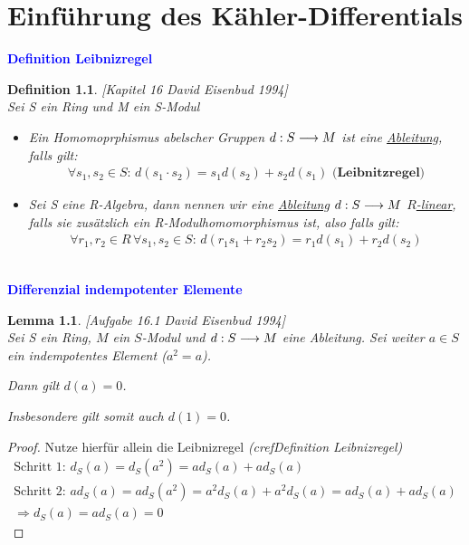 \documentclass[10pt,a4paper]{report}
\newcommand{\ModulsOfDifferenzials}{David Eisenbud 1994}
\newcounter{Aussage}[chapter]
\newtheorem{lemma}[Aussage]{Lemma}
\newtheorem{definition}[Aussage]{Definition}
\newcommand{\functionfront}[3]{\nolinebreak{#1:#2 \longrightarrow #3}}
\newcommand{\divf}[1]{d_{#1}}
\begin{document}
\chapter{Einführung des Kähler-Differentials}

\textcolor{blue}{\textbf{Definition Leibnizregel}}
\begin{definition}\label{Definition Leibnizregel} \textit{[Kapitel 16 \ModulsOfDifferenzials]}\\
Sei S ein Ring und M ein S-Modul
\begin{itemize}
\item[]Ein Homomoprphismus abelscher Gruppen $\functionfront{d}{S}{M}$ ist eine \underline{Ableitung}, falls gilt:
\begin{gather*}
\forall s_1,s_2 \in S :\, d(s_1 \cdot s_2) = s_1d(s_2) + s_2d(s_1) \textbf{ (Leibnitzregel)}
\end{gather*}
\item[]Sei S eine R-Algebra, dann nennen wir eine \underline{Ableitung} $\functionfront{d}{S}{M}$ \underline{$R$-linear}, falls sie zusätzlich ein R-Modulhomomorphismus ist, also falls gilt:
\begin{gather*}
\forall r_1,r_2 \in R \, \forall s_1,s_2 \in S : \, d(r_1 s_1 + r_2 s_2) = r_1 d(s_1) + r_2 d(s_2)
\end{gather*}
\end{itemize}
\end{definition}


\ \\
\textcolor{blue}{\textbf{Differenzial indempotenter Elemente}}
\begin{lemma}\label{Differenzial indempotenter Elemente} \textit{[Aufgabe 16.1 \ModulsOfDifferenzials]} \\
Sei S ein Ring, $M$ ein $S$-Modul und $\functionfront{d}{S}{M}$ eine Ableitung. Sei weiter $a \in S$ ein indempotentes Element ($a^2 = a$).
\begin{center}
Dann gilt $d(a) = 0$. 
\end{center}
Insbesondere gilt somit auch $d(1) = 0$.
\end{lemma}
\begin{proof}
Nutze hierfür allein die Leibnizregel \textit{(cref{Definition Leibnizregel})}
\begin{gather*}
\text{Schritt 1: } \divf{S}(a) = \divf{S}(a^2) = a\divf{S}(a) + a\divf{S}(a) \\
\text{Schritt 2: } a\divf{S}(a) = a\divf{S}(a^2) = a^2\divf{S}(a) + a^2\divf{S}(a) = a\divf{S}(a) + a\divf{S}(a)\\
\Rightarrow \divf{S}(a) = a\divf{S}(a) = 0
\end{gather*}
\end{proof}
\end{document}
